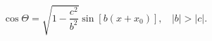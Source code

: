 \begin{equation}                                       \label{esolth}
  \cos\Theta=\sqrt{1-\frac{c^2}{b^2}}\sin[b(x+x_0)],~~~~|b|>|c|.
\end{equation}

